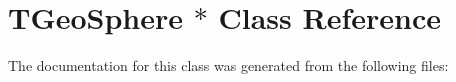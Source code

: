 \hypertarget{class_t_geo_sphere_01_5}{}\section{T\+Geo\+Sphere $\ast$ Class Reference}
\label{class_t_geo_sphere_01_5}


The documentation for this class was generated from the following files\+: